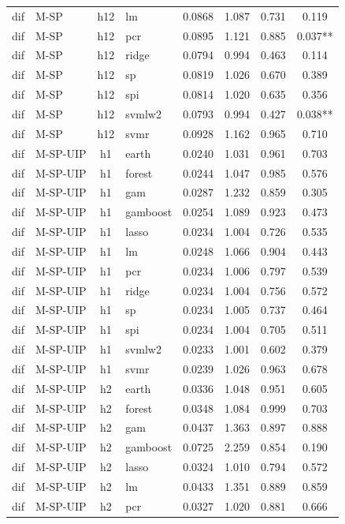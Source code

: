\begin{ThreePartTable}
\begin{longtable}[t]{llclcccc}
dif & M-SP & h12 & lm & 0.0868 & 1.087 & 0.731 & 0.119\\
dif & M-SP & h12 & pcr & 0.0895 & 1.121 & 0.885 & 0.037**\\
dif & M-SP & h12 & ridge & 0.0794 & 0.994 & 0.463 & 0.114\\
dif & M-SP & h12 & sp & 0.0819 & 1.026 & 0.670 & 0.389\\
dif & M-SP & h12 & spi & 0.0814 & 1.020 & 0.635 & 0.356\\
dif & M-SP & h12 & svmlw2 & 0.0793 & 0.994 & 0.427 & 0.038**\\
dif & M-SP & h12 & svmr & 0.0928 & 1.162 & 0.965 & 0.710\\
\addlinespace
dif & M-SP-UIP & h1 & earth & 0.0240 & 1.031 & 0.961 & 0.703\\
dif & M-SP-UIP & h1 & forest & 0.0244 & 1.047 & 0.985 & 0.576\\
dif & M-SP-UIP & h1 & gam & 0.0287 & 1.232 & 0.859 & 0.305\\
dif & M-SP-UIP & h1 & gamboost & 0.0254 & 1.089 & 0.923 & 0.473\\
dif & M-SP-UIP & h1 & lasso & 0.0234 & 1.004 & 0.726 & 0.535\\
dif & M-SP-UIP & h1 & lm & 0.0248 & 1.066 & 0.904 & 0.443\\
dif & M-SP-UIP & h1 & pcr & 0.0234 & 1.006 & 0.797 & 0.539\\
dif & M-SP-UIP & h1 & ridge & 0.0234 & 1.004 & 0.756 & 0.572\\
dif & M-SP-UIP & h1 & sp & 0.0234 & 1.005 & 0.737 & 0.464\\
dif & M-SP-UIP & h1 & spi & 0.0234 & 1.004 & 0.705 & 0.511\\
dif & M-SP-UIP & h1 & svmlw2 & 0.0233 & 1.001 & 0.602 & 0.379\\
dif & M-SP-UIP & h1 & svmr & 0.0239 & 1.026 & 0.963 & 0.678\\
\addlinespace
dif & M-SP-UIP & h2 & earth & 0.0336 & 1.048 & 0.951 & 0.605\\
dif & M-SP-UIP & h2 & forest & 0.0348 & 1.084 & 0.999 & 0.703\\
dif & M-SP-UIP & h2 & gam & 0.0437 & 1.363 & 0.897 & 0.888\\
dif & M-SP-UIP & h2 & gamboost & 0.0725 & 2.259 & 0.854 & 0.190\\
dif & M-SP-UIP & h2 & lasso & 0.0324 & 1.010 & 0.794 & 0.572\\
dif & M-SP-UIP & h2 & lm & 0.0433 & 1.351 & 0.889 & 0.859\\
dif & M-SP-UIP & h2 & pcr & 0.0327 & 1.020 & 0.881 & 0.666\\

\end{longtable}
\end{ThreePartTable}

